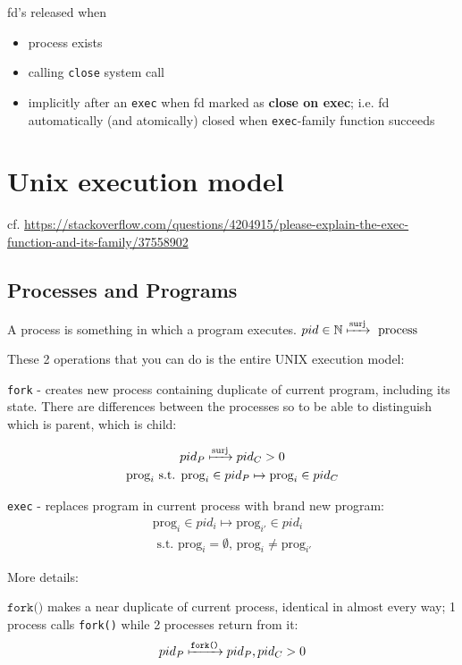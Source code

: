 \documentclass[10pt]{amsart}
\begin{document}
fd's released when
\begin{itemize}
	\item process exists
	\item calling \texttt{close} system call
	\item implicitly after an \texttt{exec} when fd marked as \textbf{close on exec}; i.e. fd automatically (and atomically) closed when \texttt{exec}-family function succeeds
\end{itemize}

\section{Unix execution model}

cf. \url{https://stackoverflow.com/questions/4204915/please-explain-the-exec-function-and-its-family/37558902}

\subsection{Processes and Programs}

A process is something in which a program executes. $pid \in \mathbb{N} \xmapsto{\text{surj}} \text{ process }$

These 2 operations that you can do is the entire UNIX execution model:

\texttt{fork} - creates new process containing duplicate of current program, including its state. There are differences between the processes so to be able to distinguish which is parent, which is child:

\[
\begin{gathered}
pid_P \xmapsto{\text{surj}} pid_C > 0 \\
\text{prog}_i \text{ s.t. } \text{prog}_i \in pid_P \mapsto \text{prog}_i \in pid_C 
\end{gathered}
\]

\texttt{exec} - replaces program in current process with brand new program:
\[
\begin{gathered}
\text{prog}_i \in pid_i \mapsto \text{prog}_{i'} \in pid_i \\
\text{ s.t. } \text{prog}_i = \emptyset, \, \text{prog}_i \neq \text{prog}_{i'}
\end{gathered}
\]

More details:

$\texttt{fork()}$ makes a near duplicate of current process, identical in almost every way; 1 process calls \texttt{fork()} while 2 processes return from it:
\[
pid_P \xmapsto{\texttt{fork()}} pid_P, pid_C >0
\]
\end{document}
